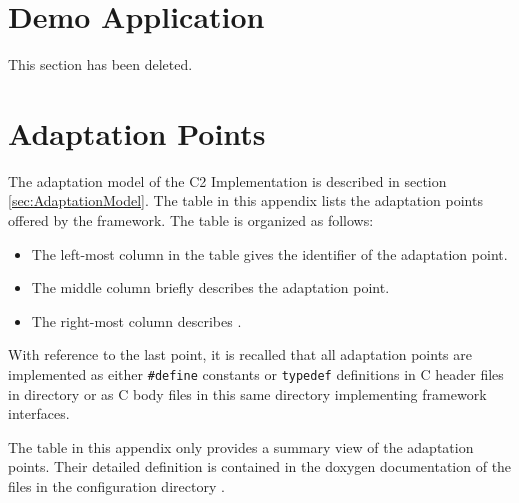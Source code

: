 \documentclass{pnp_article}
\begin{document}
\section{Demo Application}\label{sec:DemoApp}
This section has been deleted.



\appendix
\section{Adaptation Points}\label{sec:AdaptationPoints}
The adaptation model of the C2 Implementation is described in section \ref{sec:AdaptationModel}. The table in this appendix lists the adaptation points offered by the framework. The table is organized as follows:

\begin{itemize}
\item The left-most column in the table gives the identifier of the adaptation point. 
\item The middle column briefly describes the adaptation point.
\item The right-most column describes .
\end{itemize}

With reference to the last point, it is recalled that all adaptation points are implemented as either \texttt{\#define} constants or \texttt{typedef} definitions in C header files in directory  or as C body files in this same directory implementing framework interfaces.

The table in this appendix only provides a summary view of the adaptation points. Their detailed definition is contained in the doxygen documentation of the files in the configuration directory . 


\begin{landscape}


\end{landscape}

\end{document}
